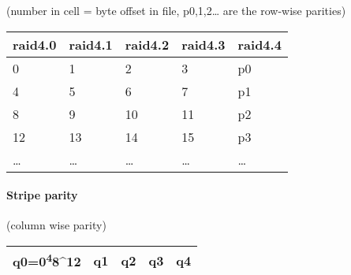 \documentclass[11pt]{article}
\begin{document}
(number in cell = byte offset in file, p0,1,2\ldots{} are the row-wise
parities)

\begin{longtable}[]{@{}lllll@{}}
\toprule
raid4.0 & raid4.1 & raid4.2 & raid4.3 & raid4.4\tabularnewline
\midrule
\endhead
0 & 1 & 2 & 3 & p0\tabularnewline
4 & 5 & 6 & 7 & p1\tabularnewline
8 & 9 & 10 & 11 & p2\tabularnewline
12 & 13 & 14 & 15 & p3\tabularnewline
\ldots{} & \ldots{} & \ldots{} & \ldots{} & \ldots{}\tabularnewline
\bottomrule
\end{longtable}

\hypertarget{stripe-parity}{%
\paragraph{Stripe parity}\label{stripe-parity}}

(column wise parity)

\begin{longtable}[]{@{}lllll@{}}
\toprule
q0=0\textsuperscript{4}8\^{}12 & q1 & q2 & q3 & q4\tabularnewline
\midrule
\endhead
\bottomrule
\end{longtable}
\end{document}
